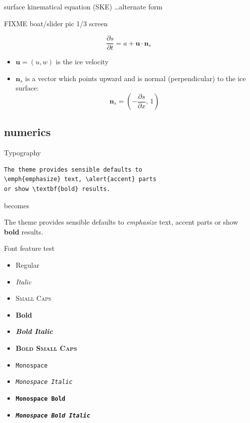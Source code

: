 \documentclass[10pt]{beamer}
\newcommand{\bn}{\mathbf{n}}
\newcommand{\bu}{\mathbf{u}}
\begin{document}
\begin{frame}{surface kinematical equation (SKE) \dots alternate form}
  \begin{center}
  FIXME boat/slider pic 1/3 screen
  \end{center}

\begin{equation*}
\frac{\partial s}{\partial t} = a + \bu \cdot \bn_s
\end{equation*}

\begin{itemize}
\item $\bu=(u,w)$ is the ice velocity
\item $\bn_s$ is a vector which points upward and is normal (perpendicular) to the ice surface:
	$$\bn_s = \left(-\frac{\partial s}{\partial x}, \,1\right)$$
\end{itemize}
\end{frame}

\subsection{numerics}

\begin{frame}[fragile]{Typography}
      \begin{verbatim}The theme provides sensible defaults to
\emph{emphasize} text, \alert{accent} parts
or show \textbf{bold} results.\end{verbatim}

  \begin{center}becomes\end{center}

  The theme provides sensible defaults to \emph{emphasize} text,
  \alert{accent} parts or show \textbf{bold} results.
\end{frame}

\begin{frame}{Font feature test}
  \begin{itemize}
    \item Regular
    \item \textit{Italic}
    \item \textsc{Small Caps}
    \item \textbf{Bold}
    \item \textbf{\textit{Bold Italic}}
    \item \textbf{\textsc{Bold Small Caps}}
    \item \texttt{Monospace}
    \item \texttt{\textit{Monospace Italic}}
    \item \texttt{\textbf{Monospace Bold}}
    \item \texttt{\textbf{\textit{Monospace Bold Italic}}}
  \end{itemize}
\end{frame}
\end{document}
